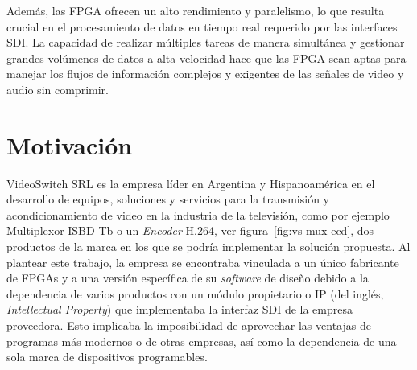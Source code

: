 Además, las FPGA ofrecen un alto rendimiento y paralelismo, lo que resulta
crucial en el procesamiento de datos en tiempo real requerido por las interfaces
SDI\@. La capacidad de realizar múltiples tareas de manera simultánea y gestionar
grandes volúmenes de datos a alta velocidad hace que las FPGA sean aptas para
manejar los flujos de información complejos y exigentes de las señales de video
y audio sin comprimir.

\section{Motivación}

VideoSwitch SRL \citep{vs-srl} es la empresa líder en Argentina y Hispanoamérica
en el desarrollo de equipos, soluciones y servicios para la transmisión y
acondicionamiento de video en la industria de la televisión, como por ejemplo
Multiplexor ISBD-Tb o un \textit{Encoder} H.264\citep{h264}, ver figura~\ref{fig:vs-mux-ecd},
dos productos de la marca en los que se podría implementar la solución propuesta.
Al plantear este trabajo, la empresa se encontraba vinculada a un único
fabricante de FPGAs y a una versión específica de su \textit{software} de
diseño debido a la dependencia de varios productos con un módulo propietario o
IP (del inglés, \textit{Intellectual Property}) que implementaba la interfaz SDI
de la empresa proveedora. Esto implicaba la imposibilidad de aprovechar las
ventajas de programas más modernos o de otras empresas, así como la dependencia
de una sola marca de dispositivos programables.

